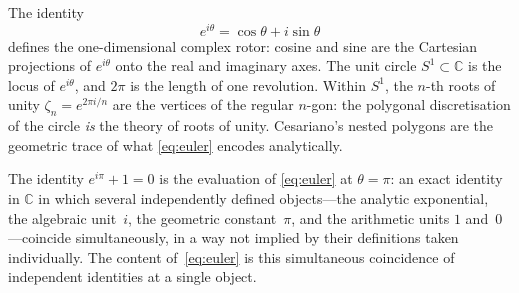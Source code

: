 \documentclass[11pt]{amsart}
\theoremstyle{definition}
\begin{document}
The identity
\begin{equation}\label{eq:euler}
  e^{i\theta} = \cos\theta + i\sin\theta
\end{equation}
defines the one-dimensional complex rotor: cosine and sine are the
Cartesian projections of $e^{i\theta}$ onto the real and imaginary
axes.  The
unit circle $S^{1}\subset\mathbb{C}$ is the locus of $e^{i\theta}$, and
$2\pi$ is the length of one revolution.  Within $S^{1}$, the
$n$-th roots of unity $\zeta_{n} = e^{2\pi i/n}$ are the vertices of
the regular $n$-gon: the polygonal discretisation of the circle
\emph{is} the theory of roots of unity.  Cesariano's nested polygons
are the geometric trace of what \eqref{eq:euler} encodes analytically.

The identity $e^{i\pi}+1=0$ is the evaluation of \eqref{eq:euler} at
$\theta=\pi$: an exact identity in $\mathbb{C}$ in which several
independently defined objects---the analytic exponential, the
algebraic unit~$i$, the geometric constant~$\pi$, and the arithmetic
units $1$ and~$0$---coincide simultaneously, in a way not implied by
their definitions taken individually.  The content of~\eqref{eq:euler}
is this simultaneous coincidence of independent identities at a
single object.
\end{document}
